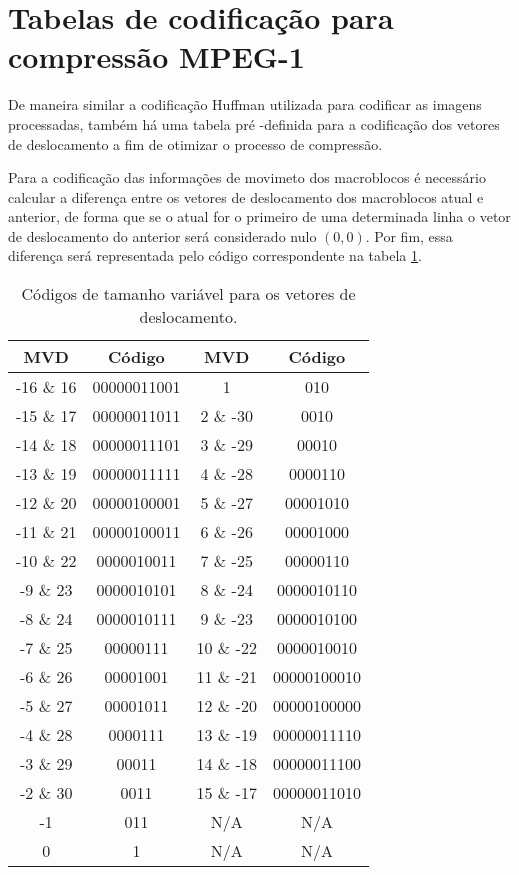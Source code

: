 
\thispagestyle{fancy}
\renewcommand{\thesubsection}{\Alph{section}}
\section{Tabelas de codificação para compressão MPEG-1}
\label{ap_MPEG}

De maneira similar a codificação Huffman utilizada para codificar as imagens processadas, também há uma tabela pré 
-definida para a codificação dos vetores de deslocamento a fim de otimizar o processo de compressão.

Para a codificação das informações de movimeto dos macroblocos é necessário calcular a diferença entre os vetores de deslocamento dos macroblocos atual e anterior, de forma que se o atual for o primeiro de uma determinada linha o vetor de deslocamento do anterior será considerado nulo $ (0,0) $. Por fim, essa diferença será representada pelo código correspondente na tabela \ref{vlc_mvd}.

\begin{table}[!ht]
\centering
\begin{tabular}{|c|c|c|c|}
\hline
MVD       & Código     & MVD       & Código      \\ \hline
-16 \& 16 & 00000011001 & 1         & 010         \\ \hline
-15 \& 17 & 00000011011 & 2 \& -30  & 0010        \\ \hline
-14 \& 18 & 00000011101 & 3 \& -29  & 00010       \\ \hline
-13 \& 19 & 00000011111 & 4 \& -28  & 0000110     \\ \hline
-12 \& 20 & 00000100001 & 5 \& -27  & 00001010    \\ \hline
-11 \& 21 & 00000100011 & 6 \& -26  & 00001000    \\ \hline
-10 \& 22 & 0000010011  & 7 \& -25  & 00000110    \\ \hline
-9 \& 23  & 0000010101  & 8 \& -24  & 0000010110  \\ \hline
-8 \& 24  & 0000010111  & 9 \& -23  & 0000010100  \\ \hline
-7 \& 25  & 00000111    & 10 \& -22 & 0000010010  \\ \hline 
-6 \& 26  & 00001001    & 11 \& -21 & 00000100010 \\ \hline
-5 \& 27  & 00001011    & 12 \& -20 & 00000100000 \\ \hline
-4 \& 28  & 0000111     & 13 \& -19 & 00000011110 \\ \hline
-3 \& 29  & 00011       & 14 \& -18 & 00000011100 \\ \hline
-2 \& 30  & 0011        & 15 \& -17 & 00000011010 \\ \hline
-1        & 011         & N/A & N/A \\ \hline
0         & 1           & N/A & N/A \\ \hline
\end{tabular}
\caption{Códigos de tamanho variável para os vetores de deslocamento.}
\label{vlc_mvd}
\end{table}